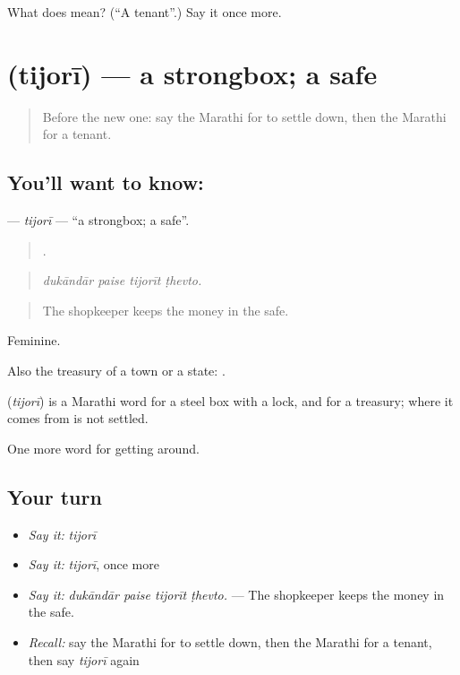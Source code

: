 \begin{tcolorbox}[breakable,colback=teal!4,colframe=teal!35!black,title={Before you move on}]
What does  mean? (\textquotedblleft{}A tenant\textquotedblright{}.) Say it once more.
\end{tcolorbox}
\section[\texorpdfstring{\mr{तिजोरी} (tijorī)}{तिजोरी (tijorī)}]{ (tijorī) — a strongbox; a safe}

\label{lesson:MR-C417-tijori}



\begin{quote}
Before the new one: say the Marathi for to settle down, then the Marathi for a tenant.
\end{quote}

\subsection*{You'll want to know: }
\textbf{} — \emph{tijorī} — \textquotedblleft{}a strongbox; a safe\textquotedblright{}.

\begin{quote}
   .
\end{quote}

\begin{quote}
\emph{dukāndār paise tijorīt ṭhevto.}
\end{quote}

\begin{quote}
The shopkeeper keeps the money in the safe.
\end{quote}

Feminine.

Also the treasury of a town or a state:  .

\begin{cousinweb}
\textbf{} (\emph{tijorī}) is a Marathi word for a steel box with a lock, and for a treasury; where it comes from is not settled.
\end{cousinweb}

\begin{grammarlens}[title={What you've built}]
One more word for getting around.
\end{grammarlens}

\subsection*{Your turn}
\begin{itemize}
\raggedright
  \item \emph{Say it:} \emph{tijorī}
  \item \emph{Say it:} \emph{tijorī}, once more
  \item \emph{Say it:} \emph{dukāndār paise tijorīt ṭhevto.} — The shopkeeper keeps the money in the safe.
  \item \emph{Recall:} say the Marathi for to settle down, then the Marathi for a tenant, then say \emph{tijorī} again
\end{itemize}

